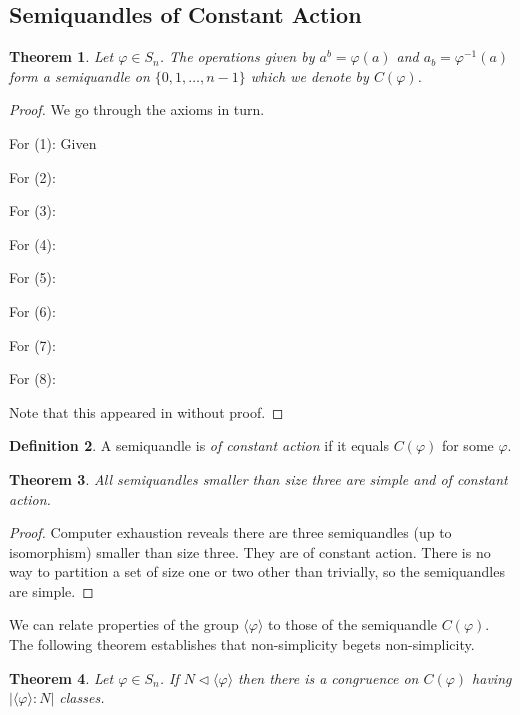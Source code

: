 \documentclass{amsart}
\newtheorem{thm}{Theorem}[section]
\theoremstyle{definition}
\newtheorem{definition}[thm]{Definition}
\numberwithin{equation}{section}
\begin{document}
\subsection{Semiquandles of Constant Action}

\begin{thm}
Let $\varphi \in S_n$. The operations given by $a^{b} = \varphi(a)$ and $a_b = \varphi^{-1}(a)$ form
a semiquandle on $\{0, 1, \ldots, n-1\}$ which we denote by $C(\varphi)$.
\end{thm}

\begin{proof}
We go through the axioms in turn.

For (1): Given 

For (2):

For (3):

For (4):

For (5):

For (6):

For (7):

For (8):


Note that this appeared in \cite{aH10} without proof.
\end{proof}

\begin{definition}
A semiquandle is \emph{of constant action} if it equals $C(\varphi)$ for some $\varphi$.
\end{definition}

\begin{thm}
All semiquandles smaller than size three are simple and of constant action.
\end{thm}

\begin{proof}
Computer exhaustion reveals there are three semiquandles (up to isomorphism) smaller than
size three. They are of constant action. There is no way to partition a set of size one or two
other than trivially, so the semiquandles are simple.
\end{proof}

We can relate properties of the group $\langle\varphi\rangle$ to those of the semiquandle $C(\varphi)$.
The following theorem establishes that non-simplicity begets non-simplicity.

\begin{thm}
Let $\varphi \in S_n$. If $N \lhd \langle\varphi\rangle$ then there is a congruence on
$C(\varphi)$ having $\left|\langle\varphi\rangle : N\right|$ classes.
\end{thm}
\end{document}
